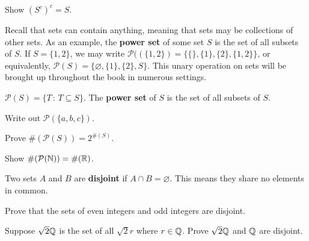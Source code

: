 \begin{exercise}
	Show $\left(S^c\right)^c = S$. 
\end{exercise}

Recall that sets can contain anything, meaning that sets may be collections of other sets. As an example, the \textbf{power set} of some set $S$ is the set of all subsets of $S$. If $S=\{1,2\}$, we may write $\mathcal{P}((\{1,2\})=\{\{\},\{1\},\{2\},\{1,2\}\}$, or equivalently, $\mathcal{P}(S)=\{\varnothing,\{1\},\{2\},S\}$. This unary operation on sets will be brought up throughout the book in numerous settings. \par

\begin{definition}
	$\mathcal{P}(S)=\{T\,:\, T\subseteq S\}$. The \textbf{power set} of $S$ is the set of all subsets of $S$. 
\end{definition}

\begin{exercise}
	Write out $\mathcal{P}(\{a,b,c\})$.
\end{exercise}
    \vspace{-3mm}

\begin{exercise}
	Prove $\#(\mathcal{P}(S))=2^{\#(S)}$.
\end{exercise}
    \vspace{-3mm}

\begin{exercise}[Challenge]
	Show $\#(\mathcal{P}(\mathbb{N}))=\#(\mathbb{R})$.
\end{exercise}
\clearpage

\begin{definition}
    Two sets $A$ and $B$ are \textbf{disjoint} if $A\cap B=\varnothing$. This means they share no elements in common.
\end{definition}

\begin{exercise}
    Prove that the sets of even integers and odd integers are disjoint. 
\end{exercise}
    \vspace{-4mm}

\begin{exercise}
    Suppose $\sqrt{2}\mathbb{Q}$ is the set of all $\sqrt{2}r$ where $r\in\mathbb{Q}$. Prove $\sqrt{2}\mathbb{Q}$ and $\mathbb{Q}$ are disjoint. 
\end{exercise}
    \vspace{-4mm}


